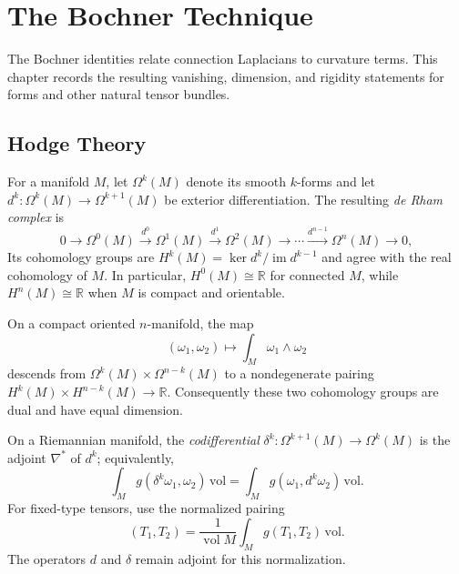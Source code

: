 \chapter{The Bochner Technique}
\label{chap:pet-the-bochner-technique}

The Bochner identities relate connection Laplacians to curvature terms.  This
chapter records the resulting vanishing, dimension, and rigidity statements
for forms and other natural tensor bundles.

\section{Hodge Theory}

\begin{definition}
  \label{def:pet-ch9-de-rham-cohomology}
  For a manifold $M$, let $\Omega^k(M)$ denote its smooth $k$-forms and let
  $d^k:\Omega^k(M)\to\Omega^{k+1}(M)$ be exterior differentiation.  The
  resulting \emph{de Rham complex} is
  \[
    0\to\Omega^0(M)\xrightarrow{d^0}\Omega^1(M)\xrightarrow{d^1}\Omega^2(M)\to\cdots
    \xrightarrow{d^{n-1}}\Omega^n(M)\to0,
  \]
  Its cohomology groups are
  $H^k(M)=\ker d^k/\operatorname{im}d^{k-1}$ and agree with the real
  cohomology of $M$.  In particular, $H^0(M)\cong\mathbb R$ for connected
  $M$, while $H^n(M)\cong\mathbb R$ when $M$ is compact and orientable.
\end{definition}

\begin{remark}
  \label{rem:pet-ch9-poincare-duality}
  On a compact oriented $n$-manifold, the map
  \[
    (\omega_1,\omega_2)\longmapsto\int_M\omega_1\wedge\omega_2
  \]
  descends from $\Omega^k(M)\times\Omega^{n-k}(M)$ to a nondegenerate pairing
  $H^k(M)\times H^{n-k}(M)\to\mathbb R$.  Consequently these two cohomology
  groups are dual and have equal dimension.
\end{remark}

\begin{definition}
  \label{def:pet-ch9-codifferential}
  On a Riemannian manifold, the \emph{codifferential}
  $\delta^k:\Omega^{k+1}(M)\to\Omega^k(M)$ is the adjoint $\nabla^*$ of $d^k$;
  equivalently,
  \[
    \int_Mg(\delta^k\omega_1,\omega_2)\,\mathrm{vol}=\int_Mg(\omega_1,d^k\omega_2)\,\mathrm{vol}.
  \]
  For fixed-type tensors, use the normalized pairing
  \[
    (T_1,T_2)=\frac1{\operatorname{vol}M}
      \int_M g(T_1,T_2)\,\mathrm{vol}.
  \]
  The operators $d$ and $\delta$ remain adjoint for this normalization.
\end{definition}

